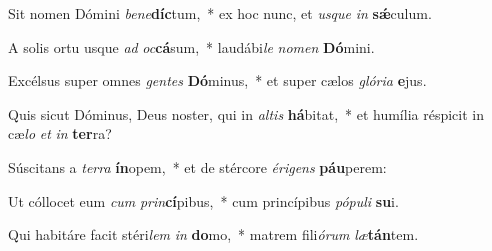 \item Sit nomen Dómini \textit{be}\textit{ne}\textbf{díc}tum,~* ex hoc nunc, et \textit{us}\textit{que} \textit{in} \textbf{sǽ}culum.
\item A solis ortu usque \textit{ad} \textit{oc}\textbf{cá}sum,~* laudábi\textit{le} \textit{no}\textit{men} \textbf{Dó}mini.
\item Excélsus super omnes \textit{gen}\textit{tes} \textbf{Dó}minus,~* et super cælos \textit{gló}\textit{ri}\textit{a} \textbf{e}jus.
\item Quis sicut Dóminus, Deus noster, qui in \textit{al}\textit{tis} \textbf{há}bitat,~* et humília réspicit in cæ\textit{lo} \textit{et} \textit{in} \textbf{ter}ra?
\item Súscitans a \textit{ter}\textit{ra} \textbf{ín}opem,~* et de stércore \textit{é}\textit{ri}\textit{gens} \textbf{páu}perem:
\item Ut cóllocet eum \textit{cum} \textit{prin}\textbf{cí}pibus,~* cum princípibus \textit{pó}\textit{pu}\textit{li} \textbf{su}i.
\item Qui habitáre facit stéri\textit{lem} \textit{in} \textbf{do}mo,~* matrem fili\textit{ó}\textit{rum} \textit{læ}\textbf{tán}tem.
